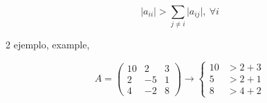 \begin{equation*}
\lvert a_{ii} \rvert > \sum_{j\neq i} \lvert a_{ij} \rvert, \ \forall i
\end{equation*}
\begin{paracol}{2}
ejemplo,
\switchcolumn
example,
\end{paracol}
\begin{equation*}
A=\begin{pmatrix}
10& 2 & 3\\
2& -5 & 1\\
4& -2 & 8
\end{pmatrix}\rightarrow \left\{ \begin{aligned}
10& > 2+3\\
5&> 2+1\\
8& > 4+2
\end{aligned} \right. 
\end{equation*}

